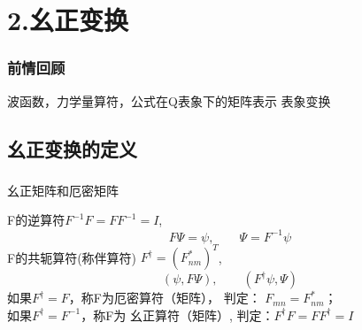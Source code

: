 

\section{2.幺正变换}

\begin{frame}
    \frametitle{前情回顾}
    \begin{itemize}
       \done 波函数，力学量算符，公式在Q表象下的矩阵表示 
       \todo 表象变换
    \end{itemize}
\end{frame} 

\subsection{幺正变换的定义}

\begin{frame} 
    \frametitle{}
    \begin{tcolorbox1}{幺正矩阵和厄密矩阵}
        \begin{enumerate}
            \Item F的逆算符$F^{-1}F=FF^{-1}=I$, $$F\Psi=\psi, \qquad \Psi=F^{-1}\psi$$  
            \Item F的共轭算符(称伴算符) $F^{\dagger}=(F_{nm} ^*)^T$, $$ (\psi, F\Psi), \qquad (F^{\dagger}\psi, \Psi)$$
            如果$F^{\dagger } =F$，称F为{\color{red}厄密算符（矩阵）}， 
            判定： $F_{mn}=F_{nm} ^*$； 
            \\ 如果$ F^{\dagger }=F^{-1}$，称F为{\color{red} 幺正算符（矩阵）}, 判定：$F^{\dagger} F= FF^{\dagger}=I$
        \end{enumerate}       
    \end{tcolorbox1}
\end{frame}

